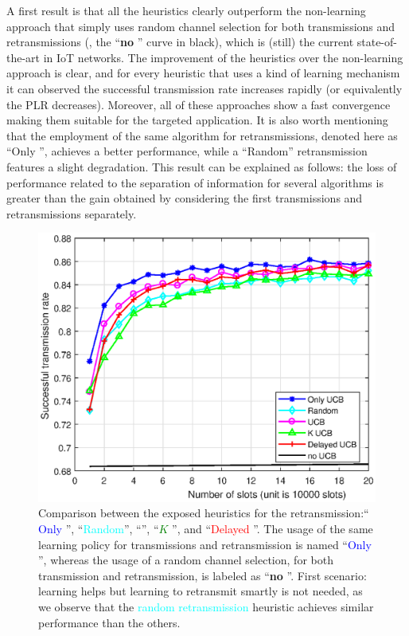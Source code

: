 A first result is that all the heuristics clearly outperform the non-learning approach that simply uses random channel selection for both transmissions and retransmissions (\ie, the ``\textbf{no \UCB{}}'' curve in black), which is (still) the current state-of-the-art in IoT networks.
The improvement of the heuristics over the non-learning approach is clear, and for every heuristic that uses a kind of learning mechanism it can observed the successful transmission rate increases rapidly (or equivalently the PLR decreases).
Moreover, all of these approaches show a fast convergence making them suitable for the targeted application.
It is also worth mentioning that the employment of the same \UCB{} algorithm for retransmissions, denoted here as ``Only \UCB{}'', achieves a better performance, while a ``Random'' retransmission features a slight degradation. This result can be explained as follows: the loss of performance related to the separation of information for several algorithms is greater than the gain obtained by considering the first transmissions and retransmissions separately.

\begin{figure}[h!]  %
	\centering
	\includegraphics[width=0.80\linewidth]{ResultsUCB.eps}
	\caption[First comparison between the exposed heuristics for the retransmission: ``Only \UCB'', ``Random, \UCB'', ``$K$ \UCB'', and ``Delayed \UCB'']{
		Comparison between the exposed heuristics for the retransmission:`` \textcolor{blue}{Only \UCB}'', ``\textcolor{cyan}{Random}'', ``\textcolor{purple}{\UCB}'', ``\textcolor{green}{$K$ \UCB}'', and ``\textcolor{red}{Delayed \UCB}''.
		The usage of the same learning policy for transmissions and retransmission is named ``\textcolor{blue}{Only \UCB{}}'',
		whereas the usage of a random channel selection, for both transmission and retransmission, is labeled as ``\textbf{no \UCB{}}''.
		First scenario: learning helps but learning to retransmit smartly is not needed, as we observe that the \textcolor{cyan}{random retransmission} heuristic achieves similar performance than the others.
	}
	\label{fig:43:mainExperiment1}
\end{figure}

